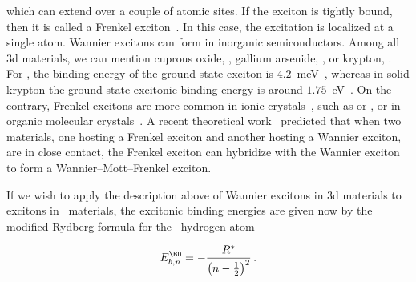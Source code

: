 \noindent which can extend over a couple of atomic sites.
If the exciton is tightly bound, then it is called a Frenkel exciton~\cite{Frenkel_1931_I,Frenkel_1931_II,Davydov_1971}.
In this case, the excitation is localized at a single atom.
Wannier excitons can form in inorganic semiconductors.
Among all \gls{3d} materials, we can mention cuprous oxide, , gallium arsenide, , or krypton, .
For , the binding energy of the ground state exciton is $4.2$~\unit{\milli\electronvolt}~\cite{GaAs_exciton_1976}, whereas in solid krypton the ground-state excitonic binding energy is around $1.75$~\unit{\electronvolt}~\cite{Laporte_1985}.
On the contrary, Frenkel excitons are more common in ionic crystals~\cite{Knox_Inchauspe_1959}, such as  or , or in organic molecular crystals~\cite{Nematiaram_Padula_Troisi_2021,Silinsh_1980}.
A recent theoretical work~\cite{Victor_Nuno_2025} predicted that when two materials, one hosting a Frenkel exciton and another hosting a Wannier exciton, are in close contact, the Frenkel exciton can hybridize with the Wannier exciton to form a Wannier--Mott--Frenkel exciton.

If we wish to apply the description above of Wannier excitons in \gls{3d} materials to excitons in \bd~materials, the excitonic binding energies are given now by the modified Rydberg formula for the \bd~hydrogen atom~\cite{2D_Hydrogen_atom_1991}

\begin{equation}
    E^{\BD}_{b,n} = - \frac{R^*}{\left(n-\frac{1}{2}\right)^2}\,.
\end{equation}

